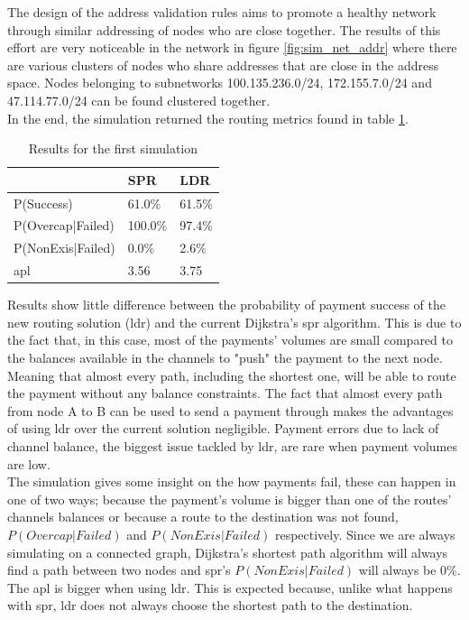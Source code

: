 The design of the address validation rules aims to promote a healthy network through similar addressing of nodes who are close together. The results of this effort are very noticeable in the network in figure \ref{fig:sim_net_addr} where there are various clusters of nodes who share addresses that are close in the address space. Nodes belonging to subnetworks 100.135.236.0/24, 172.155.7.0/24 and 47.114.77.0/24 can be found clustered together.\\
In the end, the simulation returned the routing metrics found in table \ref{table:simulation_results1}.

\begin{table}[H]
\centering
\begin{tabular}{l|l|l|}
\cline{2-3}
\rowcolor[HTML]{C0C0C0} 
\cellcolor[HTML]{FFFFFF}                  & SPR     & LDR    \\ \hline
\multicolumn{1}{|l|}{P(Success)}          & 61.0\%  & 61.5\% \\ \hline
\multicolumn{1}{|l|}{P(Overcap|Failed)}   & 100.0\% & 97.4\% \\ \hline
\multicolumn{1}{|l|}{P(NonExis|Failed)}   & 0.0\%   & 2.6\%  \\ \hline
\multicolumn{1}{|l|}{\acrshort{apl}} & 3.56    & 3.75   \\ \hline
\end{tabular}
\caption{Results for the first simulation}
\label{table:simulation_results1}
\end{table}

Results show little difference between the probability of payment success of the new routing solution (\acrshort{ldr}) and the current Dijkstra's \acrfull{spr} algorithm. This is due to the fact that, in this case, most of the payments' volumes are small compared to the balances available in the channels to "push" the payment to the next node. Meaning that almost every path, including the shortest one, will be able to route the payment without any balance constraints. The fact that almost every path from node A to B can be used to send a payment through makes the advantages of using \acrshort{ldr} over the current solution negligible. Payment errors due to lack of channel balance, the biggest issue tackled by \acrshort{ldr}, are rare when payment volumes are low.\\
The simulation gives some insight on the how payments fail, these can happen in one of two ways; because the payment's volume is bigger than one of the routes' channels balances or because a route to the destination was not found, $P(Overcap|Failed)$ and $P(NonExis|Failed)$ respectively. Since we are always simulating on a connected graph, Dijkstra's shortest path algorithm will always find a path between two nodes and \acrshort{spr}'s $P(NonExis|Failed)$ will always be 0\%.\\
The \acrfull{apl} is bigger when using \acrshort{ldr}. This is expected because, unlike what happens with \acrshort{spr}, \acrshort{ldr} does not always choose the shortest path to the destination.

